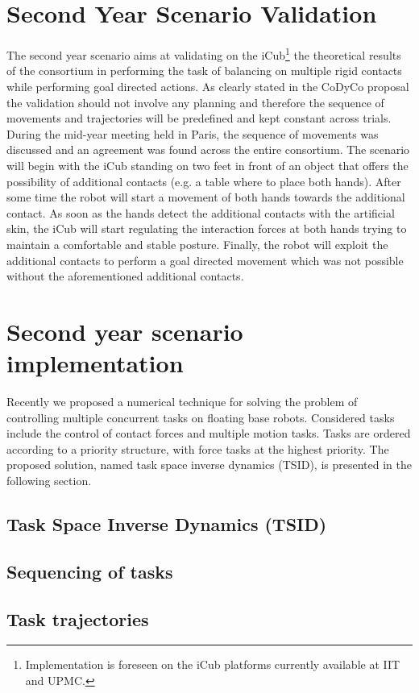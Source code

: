 \documentclass[12pt,a4paper,twoside]{article}
\begin{document}
\section{Second Year Scenario Validation} \label{sec:secondYearScenario}

The second year scenario aims at validating on the iCub\footnote{ Implementation is foreseen on the iCub platforms currently available at IIT and UPMC.} the theoretical results of the consortium in performing the task of balancing on multiple rigid contacts while performing goal directed actions. As clearly stated in the CoDyCo proposal the validation should not involve any planning and therefore the sequence of movements and trajectories will be predefined and kept constant across trials. During the mid-year meeting held in Paris, the sequence of movements was discussed and an agreement was found across the entire consortium. The scenario will begin with the iCub standing on two feet in front of an object that offers the possibility of additional contacts (e.g. a table where to place both hands). After some time the robot will start a movement of both hands towards the additional contact. As soon as the hands detect the additional contacts with the artificial skin, the iCub will start regulating the interaction forces at both hands trying to maintain a comfortable and stable posture. Finally, the robot will exploit the additional contacts to perform a goal directed movement which was not possible without the aforementioned additional contacts.

\section{Second year scenario implementation}

Recently we proposed a numerical technique \cite{delPrete2013} for solving the problem of controlling multiple concurrent tasks on floating base robots. Considered tasks include the control of contact forces and multiple motion tasks. Tasks are ordered according to a priority structure, with force tasks at the highest priority. The proposed solution, named task space inverse dynamics (TSID), is presented in the following section.

\subsection{Task Space Inverse Dynamics (TSID)} \label{sec:TSID}



\subsection{Sequencing of tasks} \label{sec:taskSequencing}




\subsection{Task trajectories} \label{sec:refTrajectories}




\end{document}
